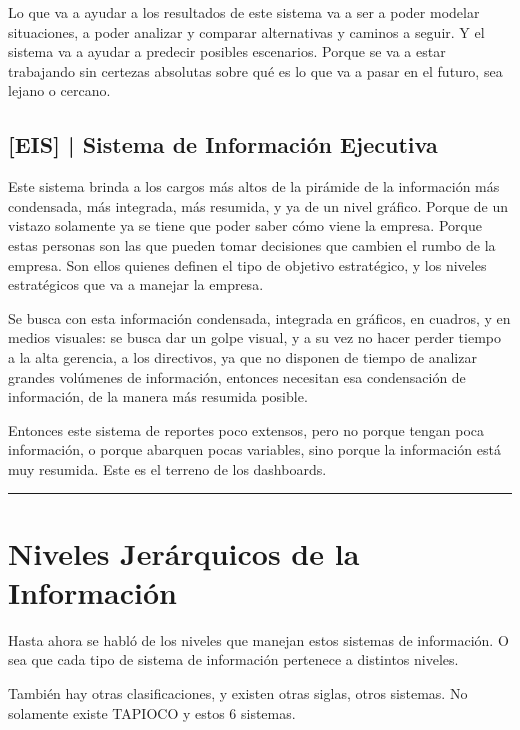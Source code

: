 Lo que va a ayudar a los resultados de este sistema va a ser a poder
modelar situaciones, a poder analizar y comparar alternativas y caminos
a seguir. Y el sistema va a ayudar a predecir posibles escenarios.
Porque se va a estar trabajando sin certezas absolutas sobre qué es lo
que va a pasar en el futuro, sea lejano o cercano.

\hypertarget{sistema-de-informaciuxf3n-ejecutiva}{%
\subsection{%
{[}EIS{]} |
Sistema de Información Ejecutiva
}\label{sistema-de-informaciuxf3n-ejecutiva}}

Este sistema brinda a los cargos más altos de la pirámide de la
información más condensada, más integrada, más resumida, y ya de un
nivel gráfico. Porque de un vistazo solamente ya se tiene que poder
saber cómo viene la empresa. Porque estas personas son las que pueden
tomar decisiones que cambien el rumbo de la empresa. Son ellos quienes
definen el tipo de objetivo estratégico, y los niveles estratégicos que
va a manejar la empresa.

Se busca con esta información condensada, integrada en gráficos, en
cuadros, y en medios visuales: se busca dar un golpe visual, y a su vez
no hacer perder tiempo a la alta gerencia, a los directivos, ya que no
disponen de tiempo de analizar grandes volúmenes de información,
entonces necesitan esa condensación de información, de la manera más
resumida posible.

Entonces este sistema de reportes poco extensos, pero no porque tengan
poca información, o porque abarquen pocas variables, sino porque la
información está muy resumida. Este es el terreno de los dashboards.

\begin{center}\rule{0.5\linewidth}{0.5pt}\end{center}

\hypertarget{niveles-jeruxe1rquicos-de-la-informaciuxf3n}{%
\section{Niveles Jerárquicos de la
Información}\label{niveles-jeruxe1rquicos-de-la-informaciuxf3n}}

Hasta ahora se habló de los niveles que manejan estos sistemas de
información. O sea que cada tipo de sistema de información pertenece a
distintos niveles.

También hay otras clasificaciones, y existen otras siglas, otros
sistemas. No solamente existe TAPIOCO y estos 6 sistemas.


